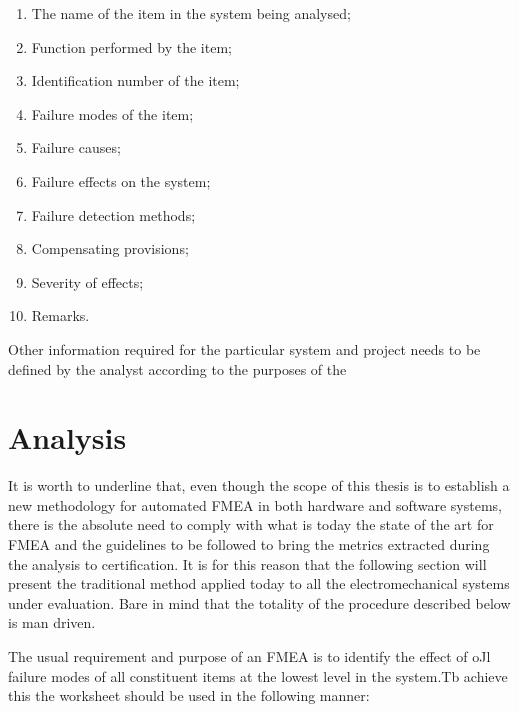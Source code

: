 \documentclass[./dissertation.tex]{subfiles}
\begin{document}
\begin{enumerate}
\item The name of the item in the system being analysed;
\item Function performed by the item;
\item Identification number of the item;
\item Failure modes of the item;
\item Failure causes;
\item Failure effects on the system;
\item Failure detection methods;
\item Compensating provisions;
\item Severity of effects;
\item Remarks.
\end{enumerate}
Other information required for the particular system and project needs to be defined by the analyst according to the purposes of the



\section{Analysis}
It is worth to underline that, even though the scope of this thesis is to establish a new methodology for automated FMEA in both hardware and software systems, there is the absolute need to comply with what is today the state of the art for FMEA and the guidelines to be followed to bring the metrics extracted during the analysis to certification. It is for this reason that the following section will present the traditional method applied today to all the electromechanical systems under evaluation. Bare in mind that the totality of the procedure described below is man driven.

The usual requirement and purpose of an FMEA is to identify the effect of oJl failure modes of all constituent items at the lowest level in the system.Tb achieve this the worksheet should be used in the following manner:
\end{document}
